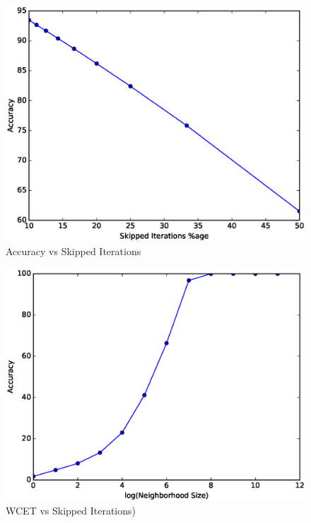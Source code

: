 \begin{figure}
  \includegraphics[width=0.95\linewidth]{Results/bubblesort1.eps}
  \caption{Accuracy vs Skipped Iterations}
  \label{binarysearch1}
\end{figure}

\begin{figure}
  \includegraphics[width=0.95\linewidth]{Results/binarysearch1.eps}
  \caption{WCET vs Skipped Iterations)}
  \label{binarysearch2}
\end{figure}

